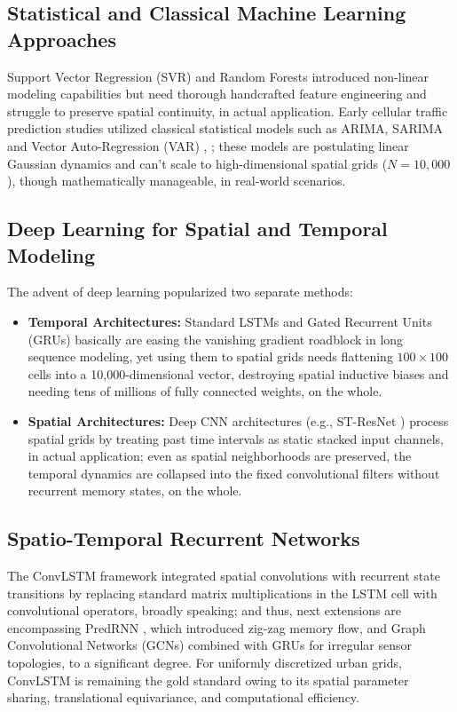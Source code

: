 \documentclass[conference]{IEEEtran}
\begin{document}
\subsection{Statistical and Classical Machine Learning Approaches}
Support Vector Regression (SVR) and Random Forests introduced non-linear modeling capabilities but need thorough handcrafted feature engineering and struggle to preserve spatial continuity, in actual application. Early cellular traffic prediction studies utilized classical statistical models such as ARIMA, SARIMA and Vector Auto-Regression (VAR) \cite{b3}, \cite{b6}; these models are postulating linear Gaussian dynamics and can't scale to high-dimensional spatial grids ($N = 10,000$), though mathematically manageable, in real-world scenarios.

\subsection{Deep Learning for Spatial and Temporal Modeling}
The advent of deep learning popularized two separate methods:
\begin{itemize}
    \item \textbf{Temporal Architectures:} Standard LSTMs \cite{b7} and Gated Recurrent Units (GRUs) basically are easing the vanishing gradient roadblock in long sequence modeling, yet using them to spatial grids needs flattening $100 \times 100$ cells into a 10,000-dimensional vector, destroying spatial inductive biases and needing tens of millions of fully connected weights, on the whole.
    \item \textbf{Spatial Architectures:} Deep CNN architectures (e.g., ST-ResNet \cite{b8}) process spatial grids by treating past time intervals as static stacked input channels, in actual application; even as spatial neighborhoods are preserved, the temporal dynamics are collapsed into the fixed convolutional filters without recurrent memory states, on the whole.
\end{itemize}

\subsection{Spatio-Temporal Recurrent Networks}
The ConvLSTM framework \cite{b4} integrated spatial convolutions with recurrent state transitions by replacing standard matrix multiplications in the LSTM cell with convolutional operators, broadly speaking; and thus, next extensions are encompassing PredRNN \cite{b9}, which introduced zig-zag memory flow, and Graph Convolutional Networks (GCNs) combined with GRUs \cite{b10} for irregular sensor topologies, to a significant degree. For uniformly discretized urban grids, ConvLSTM is remaining the gold standard owing to its spatial parameter sharing, translational equivariance, and computational efficiency.
\end{document}
